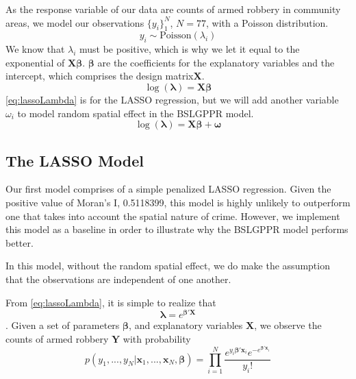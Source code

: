 \documentclass{article} %
\begin{document}
As the response variable of our data are counts of armed robbery in community areas, we model our observations $\{y_i\}_1^N$, $N = 77$, with a Poisson distribution. 
\begin{equation}
\label{eq:poislhd}
y_i \sim \text{Poisson}(\lambda_i)
\end{equation}
We know that $\lambda_i$ must be positive, which is why we let it equal to the exponential of $\mathbf{X}\boldsymbol{\beta}$. $\boldsymbol{\beta}$ are the coefficients for the explanatory variables and the intercept, which comprises the design matrix$\mathbf{X}$. 
\begin{equation}
\label{eq:lassoLambda}
\log(\boldsymbol{\lambda}) = \mathbf{X}\boldsymbol{\beta}
\end{equation}
\autoref{eq:lassoLambda} is for the LASSO regression, but we will add another variable $\omega_i$ to model random spatial effect in the BSLGPPR model. 
\begin{equation}
\label{eq:spatialLambda}
\log(\boldsymbol{\lambda}) = \mathbf{X}\boldsymbol{\beta} + \boldsymbol{\omega}
\end{equation}


\subsection{The LASSO Model}
\label{lab:LASSO}

Our first model comprises of a simple penalized LASSO regression. Given the positive value of Moran's I, 0.5118399, this model is highly unlikely to outperform one that takes into account the spatial nature of crime. However, we implement this model as a baseline in order to illustrate why the BSLGPPR model performs better.

In this model, without the random spatial effect, we do make the assumption that the observations are independent of one another. 

From \autoref{eq:lassoLambda}, it is simple to realize that 
$$ \boldsymbol{\lambda} = e^{\boldsymbol{\beta}'\mathbf{X}}$$.
Given a set of parameters $\boldsymbol{\beta}$, and explanatory variables $\mathbf{X}$, we observe the counts of armed robbery $\mathbf{Y}$ with probability
\begin{equation}
\label{eq:lhd}
p(y_1,..., y_N|\mathbf{x}_1,...,\mathbf{x}_N,\boldsymbol{\beta}) = \prod_{i=1}^{N} \frac{e^{y_i \boldsymbol{\beta}'\mathbf{x}_i}e^{-e^{\boldsymbol{\beta}'\mathbf{x}_i}}}{{y_i}!}
\end{equation}
\end{document}
